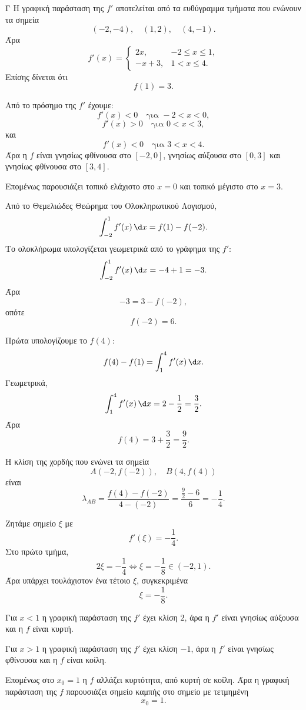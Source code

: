 \begin{thema}{Γ}
Η γραφική παράσταση της $f'$ αποτελείται από τα ευθύγραμμα τμήματα που ενώνουν τα σημεία
\[
(-2,-4),\quad (1,2),\quad (4,-1).
\]
Άρα
\[
f'(x)=
\begin{cases}
2x, & -2\leq x\leq1,\\
-x+3, & 1<x\leq4.
\end{cases}
\]
Επίσης δίνεται ότι
\[
f(1)=3.
\]
\begin{erwthma}
\item Από το πρόσημο της $f'$ έχουμε:
\[
f'(x)<0\quad\text{για }-2<x<0,
\]
\[
f'(x)>0\quad\text{για }0<x<3,
\]
και
\[
f'(x)<0\quad\text{για }3<x<4.
\]
Άρα η $f$ είναι γνησίως φθίνουσα στο $[-2,0]$, γνησίως αύξουσα στο $[0,3]$ και γνησίως φθίνουσα στο $[3,4]$.

Επομένως παρουσιάζει τοπικό ελάχιστο στο $x=0$ και τοπικό μέγιστο στο $x=3$.

\item Από το Θεμελιώδες Θεώρημα του Ολοκληρωτικού Λογισμού,
\[
\dint_{-2}^{1}f'(x)\,\d x=f(1)-f(-2).
\]
Το ολοκλήρωμα υπολογίζεται γεωμετρικά από το γράφημα της $f'$:
\[
\dint_{-2}^{1}f'(x)\,\d x
=-4+1=-3.
\]
Άρα
\[
-3=3-f(-2),
\]
οπότε
\[
{f(-2)=6}.
\]

\item Πρώτα υπολογίζουμε το $f(4)$:
\[
f(4)-f(1)=\dint_1^4 f'(x)\,\d x.
\]
Γεωμετρικά,
\[
\dint_1^4 f'(x)\,\d x
=2-\frac12=\frac32.
\]
Άρα
\[
f(4)=3+\frac32=\frac92.
\]

Η κλίση της χορδής που ενώνει τα σημεία
\[
A(-2,f(-2)),\quad B(4,f(4))
\]
είναι
\[
\lambda_{AB}
=\frac{f(4)-f(-2)}{4-(-2)}
=\frac{\frac92-6}{6}
=-\frac14.
\]

Ζητάμε σημείο $\xi$ με
\[
f'(\xi)=-\frac14.
\]
Στο πρώτο τμήμα,
\[
2\xi=-\frac14
\Leftrightarrow
\xi=-\frac18\in(-2,1).
\]
Άρα υπάρχει τουλάχιστον ένα τέτοιο $\xi$, συγκεκριμένα
\[
{\xi=-\frac18}.
\]

\item Για $x<1$ η γραφική παράσταση της $f'$ έχει κλίση $2$, άρα η $f'$ είναι γνησίως αύξουσα και η $f$ είναι κυρτή.

Για $x>1$ η γραφική παράσταση της $f'$ έχει κλίση $-1$, άρα η $f'$ είναι γνησίως φθίνουσα και η $f$ είναι κοίλη.

Επομένως στο $x_0=1$ η $f$ αλλάζει κυρτότητα, από κυρτή σε κοίλη. Άρα η γραφική παράσταση της $f$ παρουσιάζει σημείο καμπής στο σημείο με τετμημένη
\[
{x_0=1}.
\]
\end{erwthma}
\end{thema}

